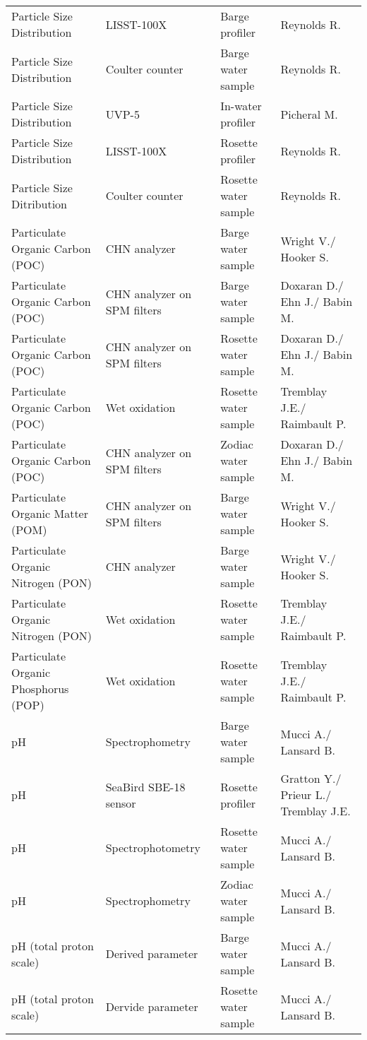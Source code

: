 \begin{longtable}[t]{llll}
Particle Size Distribution & LISST-100X & Barge profiler & Reynolds R.\\
Particle Size Distribution & Coulter counter & Barge water sample & Reynolds R.\\
Particle Size Distribution & UVP-5 & In-water profiler & Picheral M.\\
Particle Size Distribution & LISST-100X & Rosette profiler & Reynolds R.\\
Particle Size Ditribution & Coulter counter & Rosette water sample & Reynolds R.\\
\addlinespace
Particulate Organic Carbon (POC) & CHN analyzer & Barge water sample & Wright V./ Hooker S.\\
Particulate Organic Carbon (POC) & CHN analyzer on SPM filters & Barge water sample & Doxaran D./ Ehn J./ Babin M.\\
Particulate Organic Carbon (POC) & CHN analyzer on SPM filters & Rosette water sample & Doxaran D./ Ehn J./ Babin M.\\
Particulate Organic Carbon (POC) & Wet oxidation & Rosette water sample & Tremblay J.E./ Raimbault P.\\
Particulate Organic Carbon (POC) & CHN analyzer on SPM filters & Zodiac water sample & Doxaran D./ Ehn J./ Babin M.\\
\addlinespace
Particulate Organic Matter (POM) & CHN analyzer on SPM filters & Barge water sample & Wright V./ Hooker S.\\
Particulate Organic Nitrogen (PON) & CHN analyzer & Barge water sample & Wright V./ Hooker S.\\
Particulate Organic Nitrogen (PON) & Wet oxidation & Rosette water sample & Tremblay J.E./ Raimbault P.\\
Particulate Organic Phosphorus (POP) & Wet oxidation & Rosette water sample & Tremblay J.E./ Raimbault P.\\
pH & Spectrophometry & Barge water sample & Mucci A./ Lansard B.\\
\addlinespace
pH & SeaBird SBE-18 sensor & Rosette profiler & Gratton Y./ Prieur L./ Tremblay J.E.\\
pH & Spectrophotometry & Rosette water sample & Mucci A./ Lansard B.\\
pH & Spectrophometry & Zodiac water sample & Mucci A./ Lansard B.\\
pH (total proton scale) & Derived parameter & Barge water sample & Mucci A./ Lansard B.\\
pH (total proton scale) & Dervide parameter & Rosette water sample & Mucci A./ Lansard B.\\

\end{longtable}
